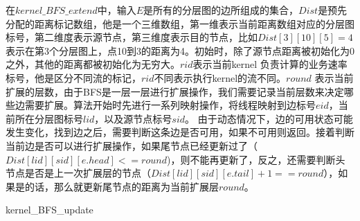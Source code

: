 在$kernel\_BFS\_extend$中，输入$E$是所有的分层图的边所组成的集合，$Dist$是预先分配的距离标记数组，他是一个三维数组，第一维表示当前距离数组对应的分层图标号，第二维度表示源节点，第三维度表示目的节点，比如$Dist[3][10][5]=4$表示在第3个分层图上，点10到3的距离为4。初始时，除了源节点距离被初始化为0之外，其他的距离都被初始化为无穷大。$rid$表示当前kernel 负责计算的业务速率标号，他是区分不同流的标记，$rid$不同表示执行kernel的流不同。$round$ 表示当前扩展的层数，由于BFS是一层一层进行扩展操作，我们需要记录当前层数来决定哪些边需要扩展。算法开始时先进行一系列映射操作，将线程映射到边标号$eid$，当前所在分层图标号$lid$，以及源节点标号$sid$。 由于动态情况下，边的可用状态可能发生变化，找到边之后，需要判断这条边是否可用，如果不可用则返回。接着判断当前边是否可以进行扩展操作，如果尾节点已经更新过了（$Dist[lid][sid][e.head]<=round$)，则不能再更新了，反之，还需要判断头节点是否是上一次扩展层的节点（$Dist[lid][sid][e.tail]+1==round$），如果是的话，那么就更新尾节点的距离为当前扩展层$round$。
\begin{algorithm}[t]
\begin{algorithmic}[1]
\EndIf
{}
\EndIf
\EndFunction
\end{algorithmic}
\caption{kernel\_BFS\_update}
\label{KernelBFS}
\end{algorithm}

